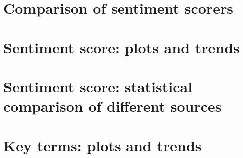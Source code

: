 \documentclass{report}
\begin{document}

\section{Comparison of sentiment scorers} \label{Comparison of sentiment scorers}



\section{Sentiment score: plots and trends} \label{Sentiment score: plots and trends}

\section{Sentiment score: statistical comparison of different sources} \label{Sentiment score: statistical comparison of different sources}


% 

\section{Key terms: plots and trends} \label{Key terms: plots and trends}

\end{document}
